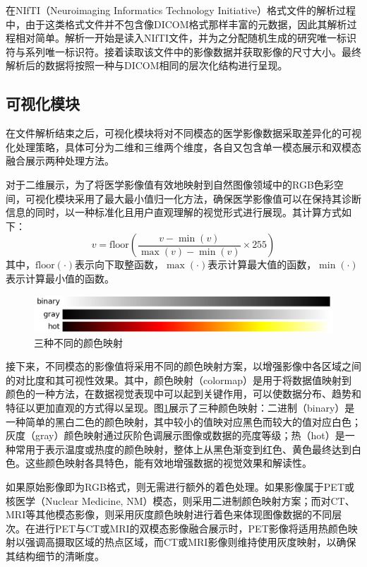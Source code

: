 在NIfTI（Neuroimaging Informatics Technology Initiative）格式文件的解析过程中，由于这类格式文件并不包含像DICOM格式那样丰富的元数据，因此其解析过程相对简单。解析一开始是读入NIfTI文件，并为之分配随机生成的研究唯一标识符与系列唯一标识符。接着读取该文件中的影像数据并获取影像的尺寸大小。最终解析后的数据将按照一种与DICOM相同的层次化结构进行呈现。

\subsection{可视化模块}

在文件解析结束之后，可视化模块将对不同模态的医学影像数据采取差异化的可视化处理策略，具体可分为二维和三维两个维度，各自又包含单一模态展示和双模态融合展示两种处理方法。

对于二维展示，为了将医学影像值有效地映射到自然图像领域中的RGB色彩空间，可视化模块采用了最大最小值归一化方法，确保医学影像值可以在保持其诊断信息的同时，以一种标准化且用户直观理解的视觉形式进行展现。其计算方式如下：
\begin{equation}
  v =\text{floor}(\frac{v - \min(v)}{\max(v) - \min(v)} \times 255)
  \label{eq:chap05_min_max}
\end{equation}
其中，\(\text{floor}(\cdot)\)表示向下取整函数，\(\max(\cdot)\)表示计算最大值的函数，\(\min(\cdot)\)表示计算最小值的函数。

\begin{figure}[htbp]
  \centering
  \includegraphics[width=\textwidth]{figures/chap05_colormap.jpg}
  \caption{三种不同的颜色映射}
  \label{fig:chap05_colormap}
\end{figure}

接下来，不同模态的影像值将采用不同的颜色映射方案，以增强影像中各区域之间的对比度和其可视性效果。其中，颜色映射（colormap）是用于将数据值映射到颜色的一种方法，在数据视觉表现中可以起到关键作用，可以使数据分布、趋势和特征以更加直观的方式得以呈现。图\ref{fig:chap05_colormap}展示了三种颜色映射：二进制（binary）是一种简单的黑白二色的颜色映射，其中较小的值映对应黑色而较大的值对应白色；灰度（gray）颜色映射通过灰阶色调展示图像或数据的亮度等级；热（hot）是一种常用于表示温度或热度的颜色映射，整体上从黑色渐变到红色、黄色最终达到白色。这些颜色映射各具特色，能有效地增强数据的视觉效果和解读性。

如果原始影像即为RGB格式，则无需进行额外的着色处理。如果影像属于PET或核医学（Nuclear Medicine, NM）模态，则采用二进制颜色映射方案；而对CT、MRI等其他模态影像，则采用灰度颜色映射进行着色来体现图像数据的不同层次。在进行PET与CT或MRI的双模态影像融合展示时，PET影像将适用热颜色映射以强调高摄取区域的热点区域，而CT或MRI影像则维持使用灰度映射，以确保其结构细节的清晰度。

